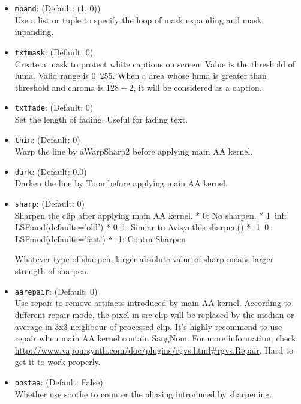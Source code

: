 \documentclass{scrartcl}
\begin{document}
\begin{itemize}
\item \texttt{mpand}: (Default: (1, 0)) \\
    Use a list or tuple to specify the loop of mask expanding and mask inpanding. 

\item \texttt{txtmask}: (Default: 0) \\
    Create a mask to protect white captions on screen. 
    Value is the threshold of luma. Valid range is 0~255. 
	When a area whose luma is greater than threshold and chroma is $128\pm2$, it will be
	considered as a caption. 

\item \texttt{txtfade}: (Default: 0) \\
    Set the length of fading. Useful for fading text. 

\item \texttt{thin}: (Default: 0) \\
    Warp the line by aWarpSharp2 before applying main AA kernel. 

\item \texttt{dark}: (Default: 0.0) \\
    Darken the line by Toon before applying main AA kernel. 

\item \texttt{sharp}: (Default: 0) \\
    Sharpen the clip after applying main AA kernel. 
	* 0: No sharpen. 
    * 1~inf: LSFmod(defaults='old')
    * 0~1: Simlar to Avisynth's sharpen()
    * -1~0: LSFmod(defaults='fast')
    * -1: Contra-Sharpen

    Whatever type of sharpen, larger absolute value of sharp means larger strength of sharpen. 

\item \texttt{aarepair}: (Default: 0) \\
    Use repair to remove artifacts introduced by main AA kernel. 
	According to different repair mode, the pixel in src clip will be replaced by
	the median or average in 3x3 neighbour of processed clip. 
	It's highly recommend to use repair when main AA kernel contain SangNom.  For more information, check \url{http://www.vapoursynth.com/doc/plugins/rgvs.html#rgvs.Repair}.  Hard to get it to work properly.

\item \texttt{postaa}: (Default: False) \\
    Whether use soothe to counter the aliasing introduced by sharpening. 


\end{itemize}
\end{document}
